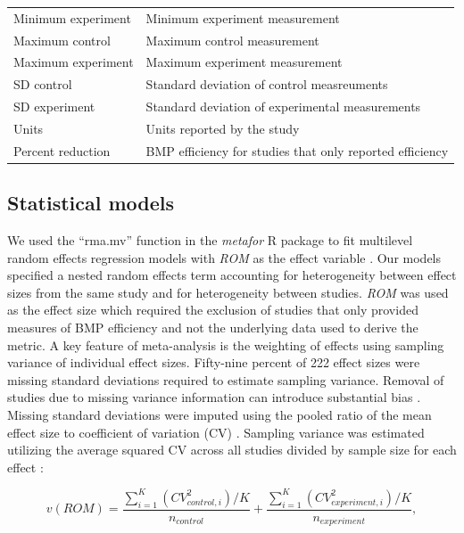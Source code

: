 \documentclass[utf8]{FrontiersinHarvard}
\begin{document}
\begin{table}
\begin{tabular}[t]{>{\raggedright\arraybackslash}p{10em}>{\raggedright\arraybackslash}p{25em}}
Minimum experiment & Minimum experiment measurement\\
Maximum control & Maximum control measurement\\
Maximum experiment & Maximum experiment measurement\\
\addlinespace
SD control & Standard deviation of control measreuments\\
SD experiment & Standard deviation of experimental measurements\\
Units & Units reported by the study\\
Percent reduction & BMP efficiency for studies that only reported efficiency\\
\bottomrule
\end{tabular}
\end{table}

\hypertarget{statistical-models}{%
\subsection{Statistical models}\label{statistical-models}}

We used the ``rma.mv'' function in the \emph{metafor} R package to fit multilevel random effects regression models with \emph{ROM} as the effect variable \citep{viechtbauerConductingMetaanalysesMetafor2010, rcoreteamLanguageEnvironmentStatistical2023}.
Our models specified a nested random effects term accounting for heterogeneity between effect sizes from the same study and for heterogeneity between studies.
\emph{ROM} was used as the effect size which required the exclusion of studies that only provided measures of BMP efficiency and not the underlying data used to derive the metric.
A key feature of meta-analysis is the weighting of effects using sampling variance of individual effect sizes.
Fifty-nine percent of 222 effect sizes were missing standard deviations required to estimate sampling variance.
Removal of studies due to missing variance information can introduce substantial bias \citep{kambachConsequencesMultipleImputation2020}.
Missing standard deviations were imputed using the pooled ratio of the mean effect size to coefficient of variation (CV) \citep{brackenStatisticalMethodsAnalysis1992}.
Sampling variance was estimated utilizing the average squared CV across all studies divided by sample size for each effect \citep{nakagawaRobustReadilyImplementable2023, doncasterCorrectionBiasMeta2018}:

\[
v(ROM) = \frac{\sum_{i=1}^{K}{(CV^2_{control,i})/K}}{n_{control}} + \frac{\sum_{i=1}^{K}{(CV^2_{experiment,i})/K}}{n_{experiment}},
\]
\end{document}
